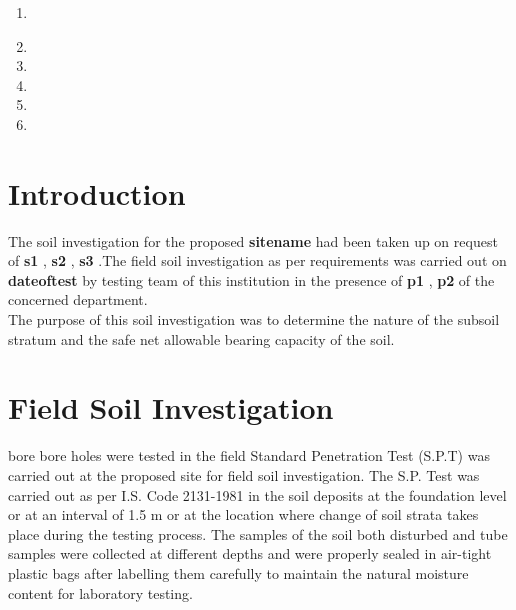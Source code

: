 \documentclass{sett}
\begin{document}
\clearpage
{}
\begin{enumerate}
\item{
}
\item{}
\item{}
\item{}
\item{}
\item{}
\end{enumerate}
\clearpage
\section{Introduction}
The soil investigation for the proposed \textbf{
	{{sitename}}
} had been taken up on request of 
	\textbf{
	{{s1}}
	},
	\textbf{
	{{s2}}
	},
	\textbf{
	{{s3}}
	}
 .The field soil investigation as per requirements was carried out on 
\textbf{
{{dateoftest}}
}
  by testing team of this institution in the presence of 
\textbf{
{{p1}}
},
\textbf{
{{p2}}
}
 of the concerned department.\\
The purpose of this soil investigation was to determine the nature of the subsoil stratum and the safe net
allowable bearing capacity of the soil.

\section{Field Soil Investigation}
{{bore}} bore holes were tested in the field Standard Penetration Test (S.P.T) was carried out at the proposed site for field soil investigation. The S.P.
Test was carried out as per I.S. Code 2131-1981 in the soil deposits at the foundation level or at an
interval of 1.5 m or at the location where change of soil strata takes place during the testing process. The
samples of the soil both disturbed and tube samples were collected at different depths and were properly
sealed in air-tight plastic bags after labelling them carefully to maintain the natural moisture content for
laboratory testing.
\end{document}
